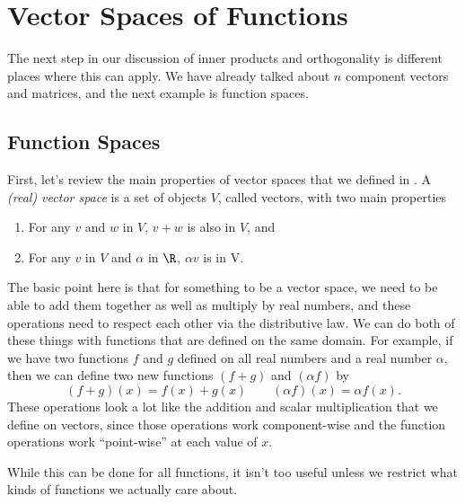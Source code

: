 \section{Vector Spaces of Functions} \label{functionVS:section}


The next step in our discussion of inner products and orthogonality is different places where this can apply. We have already talked about $n$ component vectors and matrices, and the next example is function spaces.

\subsection{Function Spaces}

First, let's review the main properties of vector spaces that we defined in . A \emph{(real) vector space} is a set of objects $V$, called vectors, with two main properties
\begin{enumerate}
\item For any $v$ and $w$ in $V$, $v+w$ is also in $V$, and
\item For any $v$ in $V$ and $\alpha$ in $\R$, $\alpha v$ is in V. 
\end{enumerate}
The basic point here is that for something to be a vector space, we need to be able to add them together as well as multiply by real numbers, and these operations need to respect each other via the distributive law. We can do both of these things with functions that are defined on the same domain. For example, if we have two functions $f$ and $g$ defined on all real numbers and a real number $\alpha$, then we can define two new functions $(f+g)$ and $(\alpha f)$ by
\[ (f+g)(x) = f(x) + g(x) \qquad (\alpha f)(x) = \alpha f(x). \]
These operations look a lot like the addition and scalar multiplication that we define on vectors, since those operations work component-wise and the function operations work ``point-wise'' at each value of $x$. 

While this can be done for all functions, it isn't too useful unless we restrict what kinds of functions we actually care about. 

